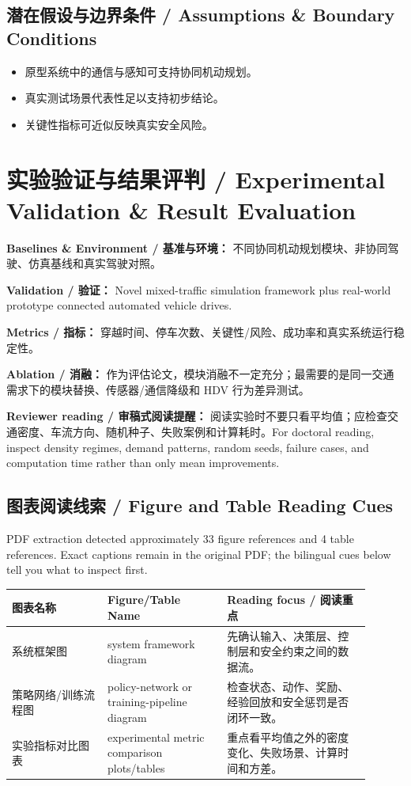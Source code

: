 \documentclass[UTF8,a4paper,11pt,fontset=fandol]{ctexart}
\begin{document}
\subsection{潜在假设与边界条件 / Assumptions \& Boundary Conditions}
\begin{itemize}
\item 原型系统中的通信与感知可支持协同机动规划。
\item 真实测试场景代表性足以支持初步结论。
\item 关键性指标可近似反映真实安全风险。
\end{itemize}


\section{实验验证与结果评判 / Experimental Validation \& Result Evaluation}
\textbf{Baselines \& Environment / 基准与环境：} 不同协同机动规划模块、非协同驾驶、仿真基线和真实驾驶对照。

\textbf{Validation / 验证：} Novel mixed-traffic simulation framework plus real-world prototype connected automated vehicle drives.

\textbf{Metrics / 指标：} 穿越时间、停车次数、关键性/风险、成功率和真实系统运行稳定性。

\textbf{Ablation / 消融：} 作为评估论文，模块消融不一定充分；最需要的是同一交通需求下的模块替换、传感器/通信降级和 HDV 行为差异测试。

\textbf{Reviewer reading / 审稿式阅读提醒：} 阅读实验时不要只看平均值；应检查交通密度、车流方向、随机种子、失败案例和计算耗时。For doctoral reading, inspect density regimes, demand patterns, random seeds, failure cases, and computation time rather than only mean improvements.

\subsection{图表阅读线索 / Figure and Table Reading Cues}
PDF extraction detected approximately 33 figure references and 4 table references. Exact captions remain in the original PDF; the bilingual cues below tell you what to inspect first.

\begin{longtable}{p{0.24\linewidth}p{0.30\linewidth}p{0.36\linewidth}}
\toprule
图表名称 & Figure/Table Name & Reading focus / 阅读重点\\
\midrule
系统框架图 & system framework diagram & 先确认输入、决策层、控制层和安全约束之间的数据流。 \\
策略网络/训练流程图 & policy-network or training-pipeline diagram & 检查状态、动作、奖励、经验回放和安全惩罚是否闭环一致。 \\
实验指标对比图表 & experimental metric comparison plots/tables & 重点看平均值之外的密度变化、失败场景、计算时间和方差。 \\
\bottomrule
\end{longtable}
\end{document}
